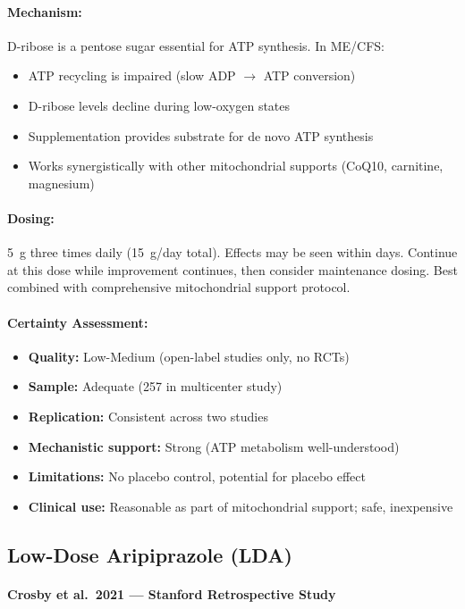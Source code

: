 \paragraph{Mechanism:}
D-ribose is a pentose sugar essential for ATP synthesis. In ME/CFS:
\begin{itemize}
    \item ATP recycling is impaired (slow ADP $\rightarrow$ ATP conversion)
    \item D-ribose levels decline during low-oxygen states
    \item Supplementation provides substrate for de novo ATP synthesis
    \item Works synergistically with other mitochondrial supports (CoQ10, carnitine, magnesium)
\end{itemize}

\paragraph{Dosing:}
5~g three times daily (15~g/day total). Effects may be seen within days. Continue at this dose while improvement continues, then consider maintenance dosing. Best combined with comprehensive mitochondrial support protocol.

\paragraph{Certainty Assessment:}
\begin{itemize}
    \item \textbf{Quality:} Low-Medium (open-label studies only, no RCTs)
    \item \textbf{Sample:} Adequate (257 in multicenter study)
    \item \textbf{Replication:} Consistent across two studies
    \item \textbf{Mechanistic support:} Strong (ATP metabolism well-understood)
    \item \textbf{Limitations:} No placebo control, potential for placebo effect
    \item \textbf{Clinical use:} Reasonable as part of mitochondrial support; safe, inexpensive
\end{itemize}

\subsection{Low-Dose Aripiprazole (LDA)}

\paragraph{Crosby et al.\ 2021 --- Stanford Retrospective Study}

